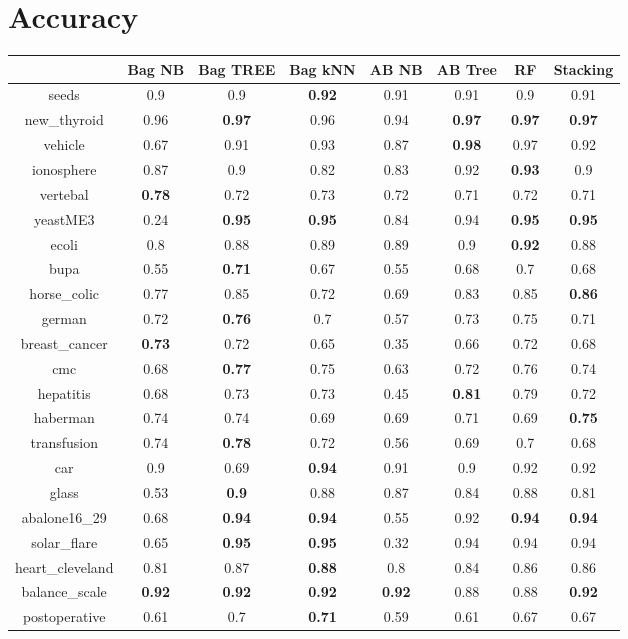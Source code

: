 \documentclass{article}%
\begin{document}
%
\normalsize%
\section*{Accuracy}%
\begin{tabular}{c|ccccccc}%
&Bag NB&Bag TREE&Bag kNN&AB NB&AB Tree&RF&Stacking\\%
\hline%
seeds&0.9&0.9&\textbf{0.92}&0.91&0.91&0.9&0.91\\%
new\_thyroid&0.96&\textbf{0.97}&0.96&0.94&\textbf{0.97}&\textbf{0.97}&\textbf{0.97}\\%
vehicle&0.67&0.91&0.93&0.87&\textbf{0.98}&0.97&0.92\\%
ionosphere&0.87&0.9&0.82&0.83&0.92&\textbf{0.93}&0.9\\%
vertebal&\textbf{0.78}&0.72&0.73&0.72&0.71&0.72&0.71\\%
yeastME3&0.24&\textbf{0.95}&\textbf{0.95}&0.84&0.94&\textbf{0.95}&\textbf{0.95}\\%
ecoli&0.8&0.88&0.89&0.89&0.9&\textbf{0.92}&0.88\\%
bupa&0.55&\textbf{0.71}&0.67&0.55&0.68&0.7&0.68\\%
horse\_colic&0.77&0.85&0.72&0.69&0.83&0.85&\textbf{0.86}\\%
german&0.72&\textbf{0.76}&0.7&0.57&0.73&0.75&0.71\\%
breast\_cancer&\textbf{0.73}&0.72&0.65&0.35&0.66&0.72&0.68\\%
cmc&0.68&\textbf{0.77}&0.75&0.63&0.72&0.76&0.74\\%
hepatitis&0.68&0.73&0.73&0.45&\textbf{0.81}&0.79&0.72\\%
haberman&0.74&0.74&0.69&0.69&0.71&0.69&\textbf{0.75}\\%
transfusion&0.74&\textbf{0.78}&0.72&0.56&0.69&0.7&0.68\\%
car&0.9&0.69&\textbf{0.94}&0.91&0.9&0.92&0.92\\%
glass&0.53&\textbf{0.9}&0.88&0.87&0.84&0.88&0.81\\%
abalone16\_29&0.68&\textbf{0.94}&\textbf{0.94}&0.55&0.92&\textbf{0.94}&\textbf{0.94}\\%
solar\_flare&0.65&\textbf{0.95}&\textbf{0.95}&0.32&0.94&0.94&0.94\\%
heart\_cleveland&0.81&0.87&\textbf{0.88}&0.8&0.84&0.86&0.86\\%
balance\_scale&\textbf{0.92}&\textbf{0.92}&\textbf{0.92}&\textbf{0.92}&0.88&0.88&\textbf{0.92}\\%
postoperative&0.61&0.7&\textbf{0.71}&0.59&0.61&0.67&0.67\\%
\end{tabular}
\end{document}
